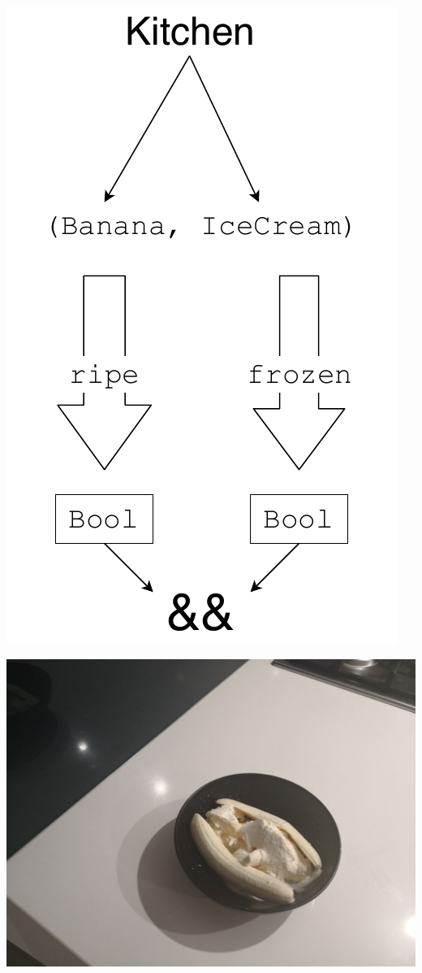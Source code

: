 \documentclass[UKenglish,usenames,dvipsnames,svgnames,table,aspectratio=169,mathserif]{beamer}
\begin{document}
\begin{frame}
\centering
\includegraphics[scale=0.6]{banana2.pdf}
\end{frame}


\begin{frame}
\centering
\includegraphics[scale=0.09]{images/banana2.jpg}
\end{frame}
\end{document}
